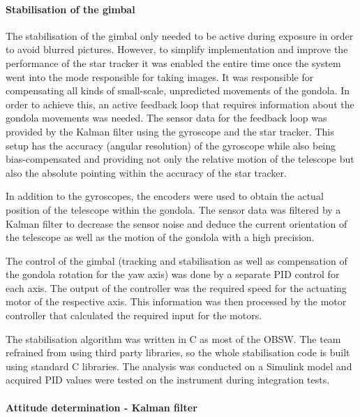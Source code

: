\paragraph{Stabilisation of the gimbal}

The stabilisation of the gimbal only needed to be active during exposure in order to avoid blurred pictures. However, to simplify implementation and improve the performance of the star tracker it was enabled the entire time once the system went into the mode responsible for taking images. It was responsible for compensating all kinds of small-scale, unpredicted movements of the gondola. In order to achieve this, an active feedback loop that requires information about the gondola movements was needed. The sensor data for the feedback loop was provided by the Kalman filter using the gyroscope and the star tracker. This setup has the accuracy (angular resolution) of the gyroscope while also being bias-compensated and providing not only the relative motion of the telescope but also the absolute pointing within the accuracy of the star tracker.

In addition to the gyroscopes, the encoders were used to obtain the actual position of the telescope within the gondola. The sensor data was filtered by a Kalman filter to decrease the sensor noise and deduce the current orientation of the telescope as well as the motion of the gondola with a high precision.

The control of the gimbal (tracking and stabilisation as well as compensation of the gondola rotation for the yaw axis) was done by a separate PID control for each axis. The output of the controller was the required speed for the actuating motor of the respective axis. This information was then processed by the motor controller that calculated the required input for the motors.

The stabilisation algorithm was written in C as most of the OBSW. The team refrained from using third party libraries, so the whole stabilisation code is built using standard C libraries. The analysis was conducted on a Simulink model and acquired PID values were tested on the instrument during integration tests.

\paragraph{Attitude determination - Kalman filter}

